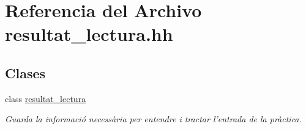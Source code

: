 \hypertarget{resultat__lectura_8hh}{}\section{Referencia del Archivo resultat\+\_\+lectura.\+hh}
\label{resultat__lectura_8hh}
\subsection*{Clases}
\begin{DoxyCompactItemize}
\item 
class \hyperlink{classresultat__lectura}{resultat\+\_\+lectura}
\begin{DoxyCompactList}\small\item\em Guarda la informació necessària per entendre i tractar l’entrada de la pràctica. \end{DoxyCompactList}\end{DoxyCompactItemize}
